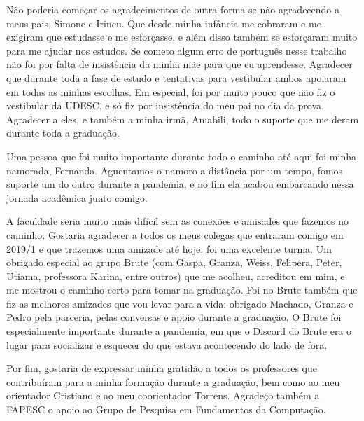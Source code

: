 \begin{agradecimentos}

Não poderia começar os agradecimentos de outra forma se não agradecendo a meus pais, Simone e Irineu. Que desde minha infância me cobraram e me exigiram que estudasse e me esforçasse, e além disso também se esforçaram muito para me ajudar nos estudos. Se cometo algum erro de português nesse trabalho não foi por falta de insistência da minha mãe para que eu aprendesse. Agradecer que durante toda a fase de estudo e tentativas para vestibular ambos apoiaram em todas as minhas escolhas. Em especial, foi por muito pouco que não fiz o vestibular da UDESC, e só fiz por insistência do meu pai no dia da prova. Agradecer a eles, e também a minha irmã, Amabili, todo o suporte que me deram durante toda a graduação.

Uma pessoa que foi muito importante durante todo o caminho até aqui foi minha namorada, Fernanda. Aguentamos o namoro a distância por um tempo, fomos suporte um do outro durante a pandemia, e no fim ela acabou embarcando nessa jornada acadêmica junto comigo.

A faculdade seria muito mais difícil sem as conexões e amisades que fazemos no caminho. Gostaria agradecer a todos os meus colegas que entraram comigo em 2019/1 e que trazemos uma amizade até hoje, foi uma excelente turma. Um obrigado especial ao grupo Brute (com Gaspa, Granza, Weiss, Felipera, Peter, Utiama, professora Karina, entre outros)  que me acolheu, acreditou em mim, e me mostrou o caminho certo para tomar na graduação. Foi no Brute também que fiz as melhores amizades que vou levar para a vida: obrigado Machado, Granza e Pedro pela parceria, pelas conversas e apoio durante a graduação. O Brute foi especialmente importante durante a pandemia, em que o Discord do Brute era o lugar para socializar e esquecer do que estava acontecendo do lado de fora.

Por fim, gostaria de expressar minha gratidão a todos os professores que contribuíram para a minha formação durante a graduação, bem como ao meu orientador Cristiano e ao meu coorientador Torrens. Agradeço também a FAPESC o apoio ao Grupo de Pesquisa em Fundamentos da Computação.

\end{agradecimentos}
